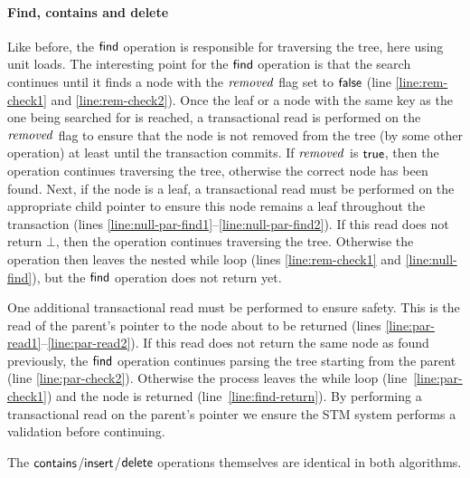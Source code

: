 \paragraph{Find, contains and delete}
Like before, the $\act{find}$ operation is responsible for traversing the tree, here using unit loads.
The interesting point for the $\act{find}$ operation is that the search continues until it finds a node with the $\ms{removed}$ flag set to $\lit{false}$
(line \ref{line:rem-check1} and \ref{line:rem-check2}).
Once the leaf or a node with the same key as the one being searched for is reached, a transactional read is performed on the $\ms{removed}$ flag to
ensure that the node is not removed from the tree (by some other operation) at least until the transaction commits.
If $\ms{removed}$ is $\lit{true}$, then the operation continues traversing the tree, otherwise 
the correct node has been found.
Next, if the node is a leaf, a transactional read must be performed on the appropriate child pointer to ensure this node remains a leaf throughout
the transaction (lines \ref{line:null-par-find1}--\ref{line:null-par-find2}).
If this read does not return $\bot$, then the operation continues traversing the tree.
Otherwise the operation then leaves the nested while loop 
(lines \ref{line:rem-check1} and \ref{line:null-find}), but the $\act{find}$ operation does not return yet.

One additional transactional read must be performed to ensure safety.
This is the read of the parent's pointer to the node about to be returned (lines \ref{line:par-read1}--\ref{line:par-read2}).
If this read does not return the same node as found previously, the $\act{find}$ operation continues parsing the tree 
starting from the parent (line \ref{line:par-check2}).
Otherwise the process leaves the while loop (line~\ref{line:par-check1}) and the node is returned (line~\ref{line:find-return}).
By performing a transactional read on the parent's pointer we ensure the STM system performs a validation before continuing.

The $\act{contains}$/$\act{insert}$/$\act{delete}$ operations themselves are identical in both algorithms.

